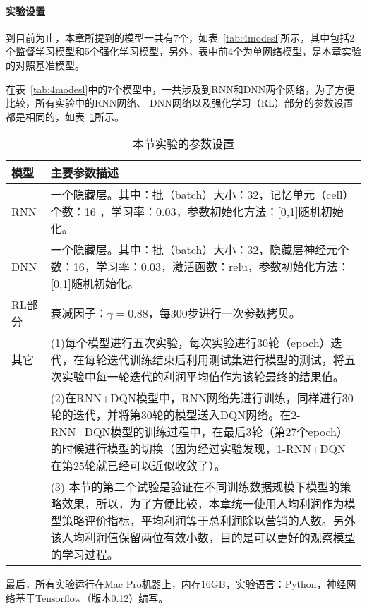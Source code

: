 \paragraph{实验设置}
到目前为止，本章所提到的模型一共有7个，如表~\ref{tab:4modesl}所示，其中包括2个监督学习模型和5个强化学习模型，另外，表中前4个为单网络模型，是本章实验的对照基准模型。

在表~\ref{tab:4modesl}中的7个模型中，一共涉及到RNN和DNN两个网络，为了方便比较，所有实验中的RNN网络、  DNN网络以及强化学习（RL）部分的参数设置都是相同的，如表~\ref{tab:4wangluocanshu}所示。

 \begin{table}[htbp]
  \centering
  \footnotesize
  \caption{本节实验的参数设置}
  \label{tab:4wangluocanshu}
  \begin{tabular}{lp{12.1cm}}  
    \toprule
      模型 & 主要参数描述 \\
    \midrule
      RNN &一个隐藏层。其中：批（batch）大小：32，记忆单元（cell）个数：16 ，学习率：0.03，参数初始化方法：[0,1]随机初始化。\\
      DNN &一个隐藏层。其中：批（batch）大小：32，隐藏层神经元个数：16，学习率：0.03，激活函数：relu，参数初始化方法：[0,1]随机初始化。\\
      RL部分 & 衰减因子：$\gamma=0.88$，每300步进行一次参数拷贝。 \\ 
      其它 & (1)每个模型进行五次实验，每次实验进行30轮（epoch）迭代，在每轮迭代训练结束后利用测试集进行模型的测试，将五次实验中每一轮迭代的利润平均值作为该轮最终的结果值。\\
      &(2)在RNN+DQN模型中，RNN网络先进行训练，同样进行30轮的迭代，并将第30轮的模型送入DQN网络。在2-RNN+DQN模型的训练过程中，在最后3轮（第27个epoch）的时候进行模型的切换（因为经过实验发现，1-RNN+DQN在第25轮就已经可以近似收敛了）。\\
      &(3) 本节的第二个试验是验证在不同训练数据规模下模型的策略效果，所以，为了方便比较，本章统一使用人均利润作为模型策略评价指标，平均利润等于总利润除以营销的人数。另外该人均利润值保留两位有效小数，目的是可以更好的观察模型的学习过程。\\     
    \bottomrule
  \end{tabular}
\end{table}

最后，所有实验运行在Mac Pro机器上，内存16GB，实验语言：Python，神经网络基于Tensorflow（版本0.12）编写。

